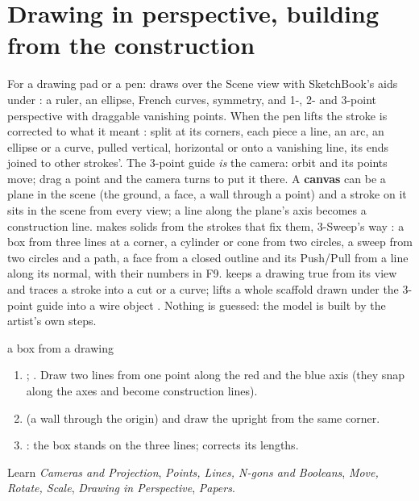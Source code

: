 \section{Drawing in perspective, building from the construction}
For a drawing pad or a pen:  draws over the Scene view with SketchBook's aids under
 \cite{SketchBookDocs2026}: a ruler, an ellipse, French curves, symmetry, and 1-, 2- and 3-point
perspective with draggable vanishing points. When the pen lifts the stroke is corrected to what it meant
\cite{Igarashi1997Interactive}: split at its corners, each piece a line, an arc, an ellipse or a curve, pulled
vertical, horizontal or onto a vanishing line, its ends joined to other strokes'. The 3-point guide \emph{is} the
camera: orbit and its points move; drag a point and the camera turns to put it there. A \textbf{canvas} can be a plane
in the scene (the ground, a face, a wall through a point) and a stroke on it sits in the scene from every view; a line
along the plane's axis becomes a construction line.  makes solids from the strokes that
fix them, 3-Sweep's way \cite{Chen2013Sweep}: a box from three lines at a corner, a cylinder or cone from two
circles, a sweep from two circles and a path, a face from a closed outline and its Push/Pull from a line along its
normal, with their numbers in F9.  keeps a drawing true from its view and traces a
stroke into a cut or a curve;  lifts a whole scaffold drawn under the 3-point guide into a wire object
\cite{Gryaditskaya2020Lifting}. Nothing is guessed: the model is built by the artist's own steps.

\begin{example}{a box from a drawing}
\begin{enumerate}
  \item {}; . Draw two lines from one point along the red and the blue
    axis (they snap along the axes and become construction lines).
  \item {} (a wall through the origin) and draw the upright from the same corner.
  \item {}: the box stands on the three lines;  corrects its lengths.
\end{enumerate}
\end{example}

\begin{fromnote}{Learn}
\emph{Cameras and Projection}, \emph{Points, Lines, N-gons and Booleans}, \emph{Move, Rotate, Scale}, \emph{Drawing in
Perspective}, \emph{Papers}.
\end{fromnote}
